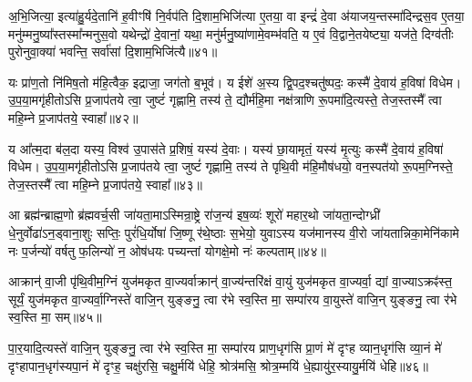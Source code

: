 अ॒भि॒जित्या॒ इत्या॑हु॒र्यदे॒तानि॑ ह॒वीꣳषि॑ नि॒र्वप॑ति दि॒शाम॒भिजि॑त्या ए॒तया॒ वा इन्द्रं॑ दे॒वा अ॑याजय॒न्तस्मा॑दिन्द्रस॒व ए॒तया॒ मनु॑म्मनु॒ष्या᳚स्तस्मा᳚न्मनुस॒वो यथेन्द्रो॑ दे॒वानां॒ यथा॒ मनु॑र्मनु॒ष्या॑णामे॒वम्भ॑वति॒ य ए॒वं वि॒द्वाने॒तयेष्ट्या॒ यज॑ते॒ दिग्व॑तीः पुरोनुवा॒क्या॑ भवन्ति॒ सर्वा॑सां दि॒शाम॒भिजि॑त्यै॥४१॥

{\anuvakamend[{अशा᳚न्तः सुषुवा॒णेनैक॑चत्वारिꣳशच्च॥15॥}]}

यः प्रा॑ण॒तो नि॑मिष॒तो म॑हि॒त्वैक॒ इद्राजा॒ जग॑तो ब॒भूव॑। य ईशे॑ अ॒स्य द्वि॒पद॒श्चतु॑ष्पदः॒ कस्मै॑ दे॒वाय॑ ह॒विषा॑ विधेम। उ॒प॒या॒मगृ॑हीतो\-ऽसि प्र॒जाप॑तये त्वा॒ जुष्टं॑ गृह्णामि॒ तस्य॑ ते॒ द्यौर्म॑हि॒मा नक्ष॑त्राणि रू॒पमा॑दि॒त्यस्ते॒ तेज॒स्तस्मै᳚ त्वा महि॒म्ने प्र॒जाप॑तये॒ स्वाहा᳚॥४२॥

{\anuvakamend[{यः प्रा॑ण॒तो द्यौरा॑दि॒त्यो᳚\-ऽष्टात्रिꣳ॑शत्॥16॥}]}

य आ᳚त्म॒दा ब॑ल॒दा यस्य॒ विश्व॑ उ॒पास॑ते प्र॒शिषं॒ यस्य॑ दे॒वाः। यस्य॑ छा॒यामृतं॒ यस्य॑ मृ॒त्युः कस्मै॑ दे॒वाय॑ ह॒विषा॑ विधेम। उ॒प॒या॒मगृ॑हीतो\-ऽसि प्र॒जाप॑तये त्वा॒ जुष्टं॑ गृह्णामि॒ तस्य॑ ते पृथि॒वी म॑हि॒मौष॑धयो॒ वन॒स्पत॑यो रू॒पम॒ग्निस्ते॒ तेज॒स्तस्मै᳚ त्वा महि॒म्ने प्र॒जाप॑तये॒ स्वाहा᳚॥४३॥

{\anuvakamend[{य आ᳚त्म॒दाः पृ॑थि॒व्य॑ग्निरेका॒न्नच॑त्वारि॒ꣳ॒शत्॥17॥}]}

आ ब्रह्म॑न्ब्राह्म॒णो ब्र॑ह्मवर्च॒सी जा॑यता॒मा\-ऽस्मिन्रा॒ष्ट्रे रा॑ज॒न्य॑ इष॒व्यः॑ शूरो॑ महार॒थो जा॑यता॒न्दोग्ध्री॑ धे॒नुर्वोढा॑\-ऽ\-न॒ड्वाना॒शुः सप्तिः॒ पुरं॑धि॒र्योषा॑ जि॒ष्णू र॑थे॒ष्ठाः स॒भेयो॒ युवा\-ऽस्य यज॑मानस्य वी॒रो जा॑यतान्निका॒मेनि॑कामे नः प॒र्जन्यो॑ वर्\mbox{}षतु फ॒लिन्यो॑ न॒ ओष॑धयः पच्यन्तां योगक्षे॒मो नः॑ कल्पताम्॥४४॥

{\anuvakamend[{आ ब्रह्म॒न्नेक॑चत्वारिꣳशत्॥18॥}]}

आक्रान्॑ वा॒जी पृ॑थि॒वीम॒ग्निं युज॑मकृत वा॒ज्यर्वाक्रान्॑ वा॒ज्य॑न्तरि॑क्षं वा॒युं युज॑मकृत वा॒ज्यर्वा॒ द्यां वा॒ज्या\-ऽक्रꣴ॑स्त॒ सूर्यं॒ युज॑मकृत वा॒ज्यर्वा॒ग्निस्ते॑ वाजि॒न् युङ्ङनु॒ त्वा र॑भे स्व॒स्ति मा॒ सम्पा॑रय वा॒युस्ते॑ वाजि॒न् युङ्ङनु॒ त्वा र॑भे स्व॒स्ति मा॒ सम्॥४५॥

पा॒र॒यादि॒त्यस्ते॑ वाजि॒न् युङ्ङनु॒ त्वा र॑भे स्व॒स्ति मा॒ सम्पा॑रय प्राण॒धृग॑सि प्रा॒णं मे॑ दृꣳह व्यान॒धृग॑सि व्या॒नं मे॑ दृꣳहापान॒धृग॑स्यपा॒नं मे॑ दृꣳह॒ चक्षु॑रसि॒ चक्षु॒र्मयि॑ धेहि॒ श्रोत्र॑मसि॒ श्रोत्र॒म्मयि॑ धे॒ह्यायु॑र॒स्यायु॒र्मयि॑ धेहि॥४६॥

{\anuvakamend[{वा॒युस्ते॑ वाजि॒न् युङ्ङनु॒ त्वा र॑भे स्व॒स्ति मा॒ सन्त्रिच॑त्वारिꣳशच्च॥19॥}]}

